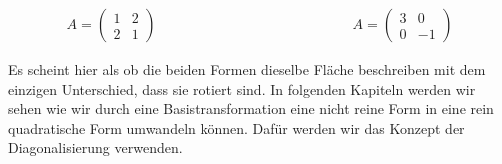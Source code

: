 \begin{figure}[h]
    \centering
    \begin{minipage}{0.4\textwidth}
        \centering
    \end{minipage}
    \hfill
    \begin{minipage}{0.4\textwidth}
        \centering
    \end{minipage}
\end{figure}

\begin{equation*}
    \begin{aligned}
        A = \begin{pmatrix} 1 & 2 \\ 2 & 1 \end{pmatrix} \qquad \qquad \qquad \qquad \qquad \qquad \qquad A = \begin{pmatrix} 3 & 0 \\ 0 & -1 \end{pmatrix}
    \end{aligned}
\end{equation*}

\vspace{0.5\baselineskip}

Es scheint hier als ob die beiden Formen dieselbe Fläche beschreiben mit dem einzigen Unterschied, dass sie rotiert sind. In folgenden Kapiteln werden wir sehen wie wir durch eine Basistransformation eine nicht reine Form in eine rein quadratische Form umwandeln können. Dafür werden wir das Konzept der Diagonalisierung verwenden. 